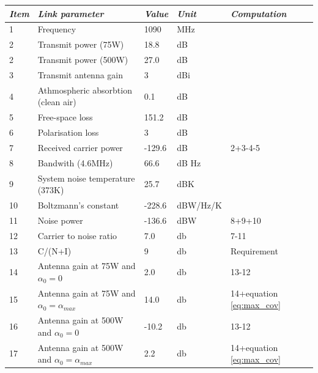 \begin{center}
 \label{tab:1090}
  \begin{tabular}{ l  l  l  l  l}
    \hline
   \textit{Item} & \textit{Link parameter} & \textit{Value} & \textit{Unit} & \textit{Computation} \\ \hline
    1 & Frequency	& 1090 & MHz & \\ \hline
    2 & Transmit power (75W) & 18.8 & dB & \\ \hline
    2 & Transmit power (500W) & 27.0 & dB & \\ \hline
    3 & Transmit antenna gain & 3 & dBi & \\ \hline
    4 & Athmospheric absorbtion (clean air) & 0.1 & dB & \\ \hline
    5 & Free-space loss & 151.2 & dB & \\ \hline
    6 & Polarisation loss & 3 & dB & \\ \hline
    7 & Received carrier power & -129.6 & dB & 2+3-4-5\\ \hline
    8 & Bandwith (4.6MHz) & 66.6 & dB Hz & \\ \hline 
    9 & System noise temperature (373K) & 25.7 & dBK& \\ \hline 
    10 & Boltzmann's constant & -228.6 & dBW/Hz/K& \\ \hline 
    11 & Noise power & -136.6 & dBW& 8+9+10\\ \hline 
    12 & Carrier to noise ratio & 7.0 & db & 7-11\\ \hline 
    13 & C/(N+I) & 9 & db & Requirement\\ \hline
    14 & Antenna gain at 75W and $\alpha_0 = 0 $ & 2.0 & db & 13-12\\ \hline
    15 & Antenna gain at 75W and $\alpha_0 = \alpha_{max} $ & 14.0 & db & 14+equation \ref{eq:max_cov} \\ \hline 
    16 & Antenna gain at 500W and  $\alpha_0 = 0 $  & -10.2 & db & 13-12\\ \hline
    17 & Antenna gain at 500W and $\alpha_0 = \alpha_{max} $ & 2.2 & db & 14+equation \ref{eq:max_cov} \\ \hline \end{tabular}
\end{center}


